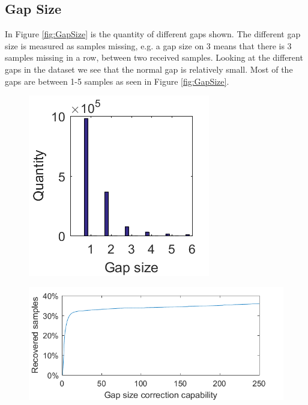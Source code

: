 \subsection{Gap Size}
In Figure \ref{fig:GapSize} is the quantity of different gaps shown. The different gap size is measured as samples missing, e.g. a gap size on 3 means that there is 3 samples missing in a row, between two received samples. Looking at the different gaps in the dataset we see that the normal gap is relatively small. Most of the gaps are between 1-5 samples as seen in Figure \ref{fig:GapSize}.

\begin{figure}[H]
\centering
\begin{minipage}{.3\textwidth}
  \centering
  \includegraphics[width=1\linewidth]{billeder/GapInfo1.png}
  \label{fig:GapSize}
\end{minipage}%
\begin{minipage}{.8\textwidth}
  \centering
  \includegraphics[width=0.8\linewidth]{billeder/CorrectionCapability.png}
  \label{fig:GapCorrect}
\end{minipage}
\end{figure}

